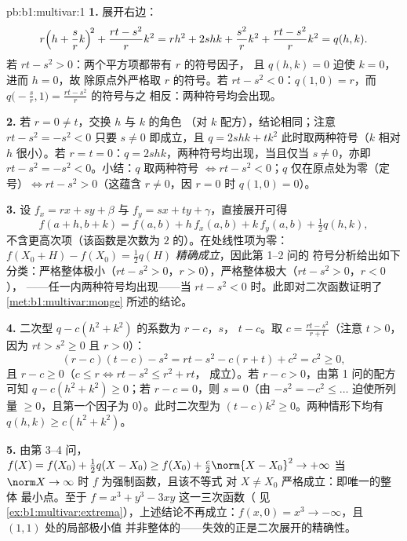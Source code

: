 \begin{solution}{pb:b1:multivar:1}
\textbf{1.} 展开右边：
\[
r\Bigl(h + \frac srk\Bigr)^{\!2} + \frac{rt - s^2}{r}k^2
= rh^2 + 2shk + \frac{s^2}{r}k^2 + \frac{rt - s^2}{r}k^2
= q(h,k) .
\]
若 $rt - s^2 > 0$：两个平方项都带有 $r$ 的符号因子，
且 $q(h,k) = 0$ 迫使 $k = 0$，进而 $h = 0$，故
除原点外严格取 $r$ 的符号。若 $rt - s^2 < 0$：$q(1, 0) = r$，而
$q\bigl(-\frac sr, 1\bigr) = \frac{rt - s^2}{r}$ 的符号与之
相反：两种符号均会出现。

\textbf{2.} 若 $r = 0 \neq t$，交换 $h$ 与 $k$ 的角色
（对 $k$ 配方），结论相同；注意
$rt - s^2 = -s^2 < 0$ 只要 $s \neq 0$ 即成立，且 $q =
2shk + tk^2$ 此时取两种符号（$k$ 相对 $h$ 很小）。若
$r = t = 0$：$q = 2shk$，两种符号均出现，当且仅当 $s \neq 0$，亦即
$rt - s^2 = -s^2 < 0$。小结：$q$ 取两种符号 $\iff rt -
s^2 < 0$；$q$ 仅在原点处为零（定号）$\iff rt -
s^2 > 0$（这蕴含 $r \neq 0$，因 $r = 0$ 时 $q(1,0) =
0$）。

\textbf{3.} 设 $f_x = rx + sy + \beta$ 与 $f_y = sx + ty +
\gamma$，直接展开可得
\[
f(a + h, b + k) = f(a, b) + h\,f_x(a,b) + k\,f_y(a,b)
+ \tfrac12 q(h, k),
\]
不含更高次项（该函数是次数为
$2$ 的）。在处线性项为零：$f(X_0 + H)
- f(X_0) = \frac12 q(H)$ \emph{精确成立}，因此第 1--2 问的
符号分析给出如下分类：严格整体极小（$rt - s^2 >
0$，$r > 0$），严格整体极大（$rt - s^2 > 0$，$r < 0$），
——任一内两种符号均出现——当 $rt - s^2 <
0$ 时。此即对二次函数证明了\cref{met:b1:multivar:monge}
所述的结论。

\textbf{4.} 二次型 $q - c(h^2 + k^2)$ 的系数为 $r - c$，$s$，
$t - c$。取 $c = \frac{rt - s^2}{r + t}$（注意 $t > 0$，因为
$rt > s^2 \geq 0$ 且 $r > 0$）：
\[
(r - c)(t - c) - s^2 = rt - s^2 - c(r + t) + c^2 = c^2 \geq 0,
\]
且 $r - c \geq 0$（$c \leq r \iff rt - s^2 \leq r^2 + rt$，
成立）。若 $r - c > 0$，由第 1 问的配方可知
$q - c(h^2 + k^2) \geq 0$；若 $r - c = 0$，则 $s = 0$（由
$-s^2 = -c^2 \leq \dots$ 迫使所列量
$\geq 0$，且第一个因子为 $0$）。此时二次型为 $(t - c)k^2 \geq
0$。两种情形下均有 $q(h,k) \geq c(h^2 + k^2)$。

\textbf{5.} 由第 3--4 问，$f(X) = f(X_0) + \frac12 q(X -
X_0) \geq f(X_0) + \frac c2\norm{X - X_0}^2 \to +\infty$ 当
$\norm X \to \infty$ 时 $f$ 为强制函数，且该不等式
对 $X \neq X_0$ 严格成立：即唯一的整体
最小点。至于 $f = x^3 + y^3 - 3xy$ 这一三次函数（
见\cref{ex:b1:multivar:extrema}），上述结论不再成立：$f(x,0)
= x^3 \to -\infty$，且 $(1,1)$ 处的局部极小值
并非整体的——失效的正是二次展开的精确性。


\end{solution}
